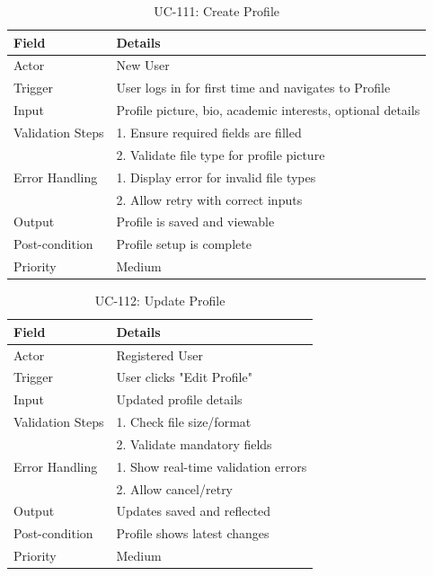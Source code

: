 \begin{table}[H]
\centering
\caption{UC-111: Create Profile}
\begin{tabular}{|l|p{10cm}|}
\hline
\textbf{Field} & \textbf{Details} \\ \hline
Actor & New User \\ \hline
Trigger & User logs in for first time and navigates to Profile \\ \hline
Input & Profile picture, bio, academic interests, optional details \\ \hline
Validation Steps & 1. Ensure required fields are filled \\ 
                 & 2. Validate file type for profile picture \\ \hline
Error Handling & 1. Display error for invalid file types \\ 
               & 2. Allow retry with correct inputs \\ \hline
Output & Profile is saved and viewable \\ \hline
Post-condition & Profile setup is complete \\ \hline
Priority & Medium \\ \hline
\end{tabular}
\end{table}

\begin{table}[H]
\centering
\caption{UC-112: Update Profile}
\begin{tabular}{|l|p{10cm}|}
\hline
\textbf{Field} & \textbf{Details} \\ \hline
Actor & Registered User \\ \hline
Trigger & User clicks "Edit Profile" \\ \hline
Input & Updated profile details \\ \hline
Validation Steps & 1. Check file size/format \\ 
                 & 2. Validate mandatory fields \\ \hline
Error Handling & 1. Show real-time validation errors \\ 
               & 2. Allow cancel/retry \\ \hline
Output & Updates saved and reflected \\ \hline
Post-condition & Profile shows latest changes \\ \hline
Priority & Medium \\ \hline
\end{tabular}
\end{table}



